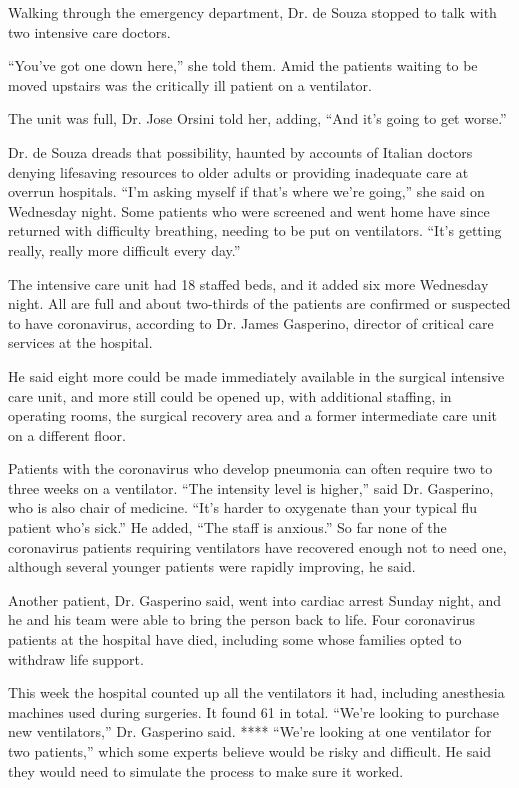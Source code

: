 Walking through the emergency department, Dr. de Souza stopped to talk
with two intensive care doctors.

``You've got one down here,'' she told them. Amid the patients waiting
to be moved upstairs was the critically ill patient on a ventilator.

The unit was full, Dr. Jose Orsini told her, adding, ``And it's going to
get worse.''

Dr. de Souza dreads that possibility, haunted by accounts of Italian
doctors denying lifesaving resources to older adults or providing
inadequate care at overrun hospitals. ``I'm asking myself if that's
where we're going,'' she said on Wednesday night. Some patients who were
screened and went home have since returned with difficulty breathing,
needing to be put on ventilators. ``It's getting really, really more
difficult every day.''

The intensive care unit had 18 staffed beds, and it added six more
Wednesday night. All are full and about two-thirds of the patients are
confirmed or suspected to have coronavirus, according to Dr. James
Gasperino, director of critical care services at the hospital.

He said eight more could be made immediately available in the surgical
intensive care unit, and more still could be opened up, with additional
staffing, in operating rooms, the surgical recovery area and a former
intermediate care unit on a different floor.

Patients with the coronavirus who develop pneumonia can often require
two to three weeks on a ventilator. ``The intensity level is higher,''
said Dr. Gasperino, who is also chair of medicine. ``It's harder to
oxygenate than your typical flu patient who's sick.'' He added, ``The
staff is anxious.'' So far none of the coronavirus patients requiring
ventilators have recovered enough not to need one, although several
younger patients were rapidly improving, he said.

Another patient, Dr. Gasperino said, went into cardiac arrest Sunday
night, and he and his team were able to bring the person back to life.
Four coronavirus patients at the hospital have died, including some
whose families opted to withdraw life support.

This week the hospital counted up all the ventilators it had, including
anesthesia machines used during surgeries. It found 61 in total. ``We're
looking to purchase new ventilators,'' Dr. Gasperino said. **** ``We're
looking at one ventilator for two patients,'' which some experts believe
would be risky and difficult. He said they would need to simulate the
process to make sure it worked.

